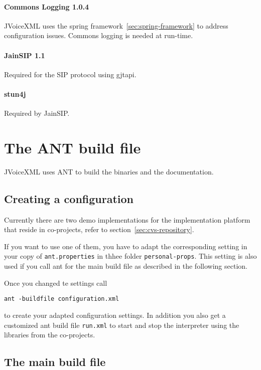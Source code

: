 \documentclass[11pt,a4paper]{article}
\begin{document}
\paragraph{Commons Logging 1.0.4}
\label{sec:commons-logging}

JVoiceXML uses the spring framework~\ref{sec:spring-framework} to address 
configuration
issues. Commons logging is needed at run-time.

\paragraph{JainSIP 1.1}

Required for the SIP protocol using gjtapi.

\paragraph{stun4j}

Required by JainSIP.

\section{The ANT build file}
\label{sec:ant-build-file}

JVoiceXML uses ANT to build the binaries and the documentation. 

\subsection{Creating a configuration}

Currently there are two demo implementations for the implementation platform
that reside in co-projects, refer to section~\ref{sec:cvs-repository}.

If you want to use one of them, you have to adapt the corresponding setting
in your copy of \texttt{ant.properties} in thhee folder \texttt{personal-props}.
This setting is also used if you call ant for the main build file as described
in the following section.

Once you changed te settings call
\begin{lstlisting}
ant -buildfile configuration.xml
\end{lstlisting}
to create your adapted configuration settings. In addition you also get
a customized ant build file \texttt{run.xml} to start and stop the interpreter
using the libraries from the co-projects.

\subsection{The main build file}
\end{document}

